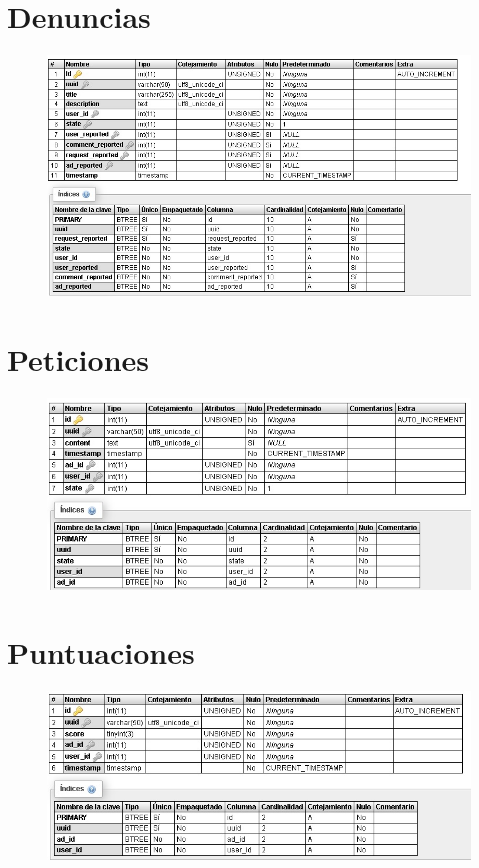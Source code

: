 \section{Denuncias}
\begin{figure}[h]
\centering
\includegraphics[width=1\textwidth]{Img/Disenyo/BD_REPORTS.jpg}
\end{figure}


\pagebreak



\section{Peticiones}
\begin{figure}[h]
\centering
\includegraphics[width=1\textwidth]{Img/Disenyo/BD_REQUESTS.jpg}
\end{figure}

\section{Puntuaciones}
\begin{figure}[h]
\centering
\includegraphics[width=1\textwidth]{Img/Disenyo/BD_SCORES.jpg}
\end{figure}


